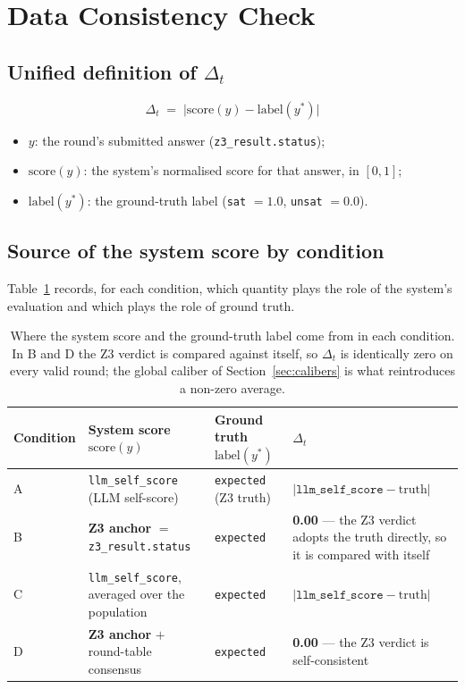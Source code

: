 \documentclass{article}
\begin{document}
\section{Data Consistency Check}
\label{app:data_consistency}

\setcounter{table}{0}
\renewcommand{\thetable}{D.\arabic{table}}

\subsection{Unified definition of $\Delta_t$}

\[
  \Delta_t \;=\; \bigl| \text{score}(y) - \text{label}(y^{*}) \bigr|
\]

\begin{itemize}
  \item $y$: the round's submitted answer (\texttt{z3\_result.status});
  \item $\text{score}(y)$: the system's normalised score for that answer, in $[0, 1]$;
  \item $\text{label}(y^{*})$: the ground-truth label (\texttt{sat} $= 1.0$, \texttt{unsat} $= 0.0$).
\end{itemize}

\subsection{Source of the system score by condition}

Table~\ref{tab:table2c_sources} records, for each condition, which quantity plays the role of the
system's evaluation and which plays the role of ground truth.

\begin{table}[t]
  \centering
  \caption{Where the system score and the ground-truth label come from in each condition. In B and D
  the Z3 verdict is compared against itself, so $\Delta_t$ is identically zero on every valid round;
  the global caliber of Section~\ref{sec:calibers} is what reintroduces a non-zero average.}
  \label{tab:table2c_sources}
  \small
  \begin{tabularx}{\textwidth}{@{}l l l >{\raggedright\arraybackslash}X@{}}
    \toprule
    Condition & System score $\text{score}(y)$ & Ground truth $\text{label}(y^{*})$ & $\Delta_t$ \\
    \midrule
    A & \texttt{llm\_self\_score} (LLM self-score) & \texttt{expected} (Z3 truth) &
        $\bigl|\texttt{llm\_self\_score} - \text{truth}\bigr|$ \\
    B & \textbf{Z3 anchor} $=$ \texttt{z3\_result.status} & \texttt{expected} &
        \textbf{0.00} --- the Z3 verdict adopts the truth directly, so it is compared with itself \\
    C & \texttt{llm\_self\_score}, averaged over the population & \texttt{expected} &
        $\bigl|\texttt{llm\_self\_score} - \text{truth}\bigr|$ \\
    D & \textbf{Z3 anchor} $+$ round-table consensus & \texttt{expected} &
        \textbf{0.00} --- the Z3 verdict is self-consistent \\
    \bottomrule
  \end{tabularx}
\end{table}
\end{document}
